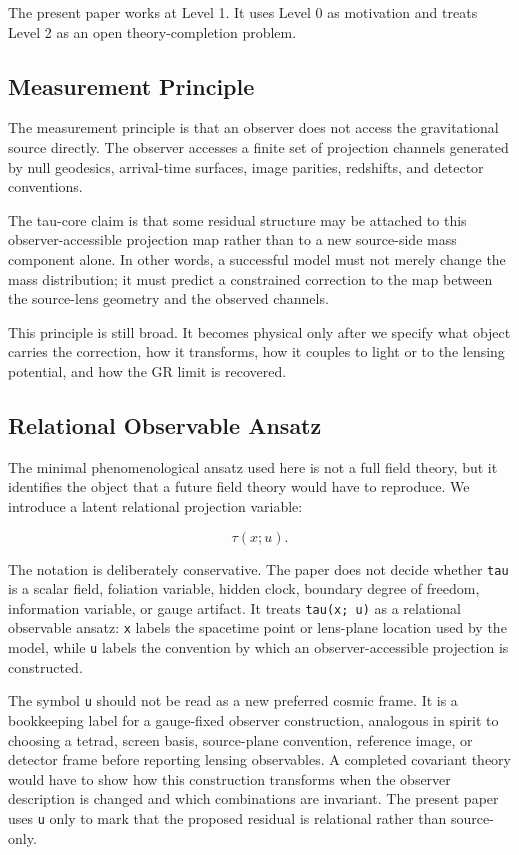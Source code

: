 \documentclass[11pt]{article}
\begin{document}
The present paper works at Level 1. It uses Level 0 as motivation and
treats Level 2 as an open theory-completion problem.

\subsection{Measurement Principle}\label{measurement-principle}

The measurement principle is that an observer does not access the
gravitational source directly. The observer accesses a finite set of
projection channels generated by null geodesics, arrival-time surfaces,
image parities, redshifts, and detector conventions.

The tau-core claim is that some residual structure may be attached to
this observer-accessible projection map rather than to a new source-side
mass component alone. In other words, a successful model must not merely
change the mass distribution; it must predict a constrained correction
to the map between the source-lens geometry and the observed channels.

This principle is still broad. It becomes physical only after we specify
what object carries the correction, how it transforms, how it couples to
light or to the lensing potential, and how the GR limit is recovered.

\subsection{Relational Observable
Ansatz}\label{relational-observable-ansatz}

The minimal phenomenological ansatz used here is not a full field
theory, but it identifies the object that a future field theory would
have to reproduce. We introduce a latent relational projection variable:

\[
\tau(x;u).
\]

The notation is deliberately conservative. The paper does not decide
whether \texttt{tau} is a scalar field, foliation variable, hidden
clock, boundary degree of freedom, information variable, or gauge
artifact. It treats \texttt{tau(x;\ u)} as a relational observable
ansatz: \texttt{x} labels the spacetime point or lens-plane location
used by the model, while \texttt{u} labels the convention by which an
observer-accessible projection is constructed.

The symbol \texttt{u} should not be read as a new preferred cosmic
frame. It is a bookkeeping label for a gauge-fixed observer
construction, analogous in spirit to choosing a tetrad, screen basis,
source-plane convention, reference image, or detector frame before
reporting lensing observables. A completed covariant theory would have
to show how this construction transforms when the observer description
is changed and which combinations are invariant. The present paper uses
\texttt{u} only to mark that the proposed residual is relational rather
than source-only.
\end{document}
